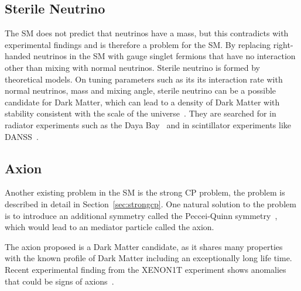 \subsection{Sterile Neutrino}
The SM does not predict that neutrinos have a mass, but this contradicts with experimental findings and is therefore a problem for the SM. By replacing right-handed neutrinos in the SM with gauge singlet fermions that have no interaction other than mixing with normal neutrinos. Sterile neutrino is formed by theoretical models. On tuning parameters such as its its interaction rate with normal neutrinos, mass and mixing angle, sterile neutrino can be a possible candidate for Dark
Matter, which can lead to a density of Dark Matter with stability consistent with the scale of the universe~\cite{dodelson1994sterile}. They are searched for in radiator experiments such as the Daya Bay~\cite{an2014search, wong2017search} and in scintillator experiments like DANSS~\cite{alekseev2018search}.

\subsection{Axion}

Another existing problem in the SM is the strong CP problem, the problem is described in detail in Section~\ref{sec:strongcp}. One natural solution to the problem is to introduce an additional symmetry called the Peccei-Quinn symmetry~\cite{peccei1977cp}, which would lead to an mediator particle called the axion. 

The axion proposed is a Dark Matter candidate, as it shares many properties with the known profile of Dark Matter including an exceptionally long life time. Recent experimental finding from the XENON1T experiment shows anomalies that could be signs of axions~\cite{aprile2020excess}.




